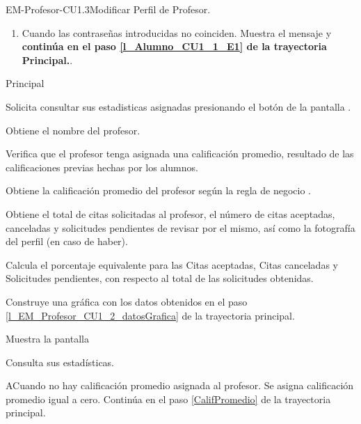 \begin{UseCase}{EM-Profesor-CU1.3}{Modificar Perfil de Profesor.}
{\begin{enumerate}
			\item \label{EM-Profesor-CU1-3-E2} Cuando las contraseñas introducidas no coinciden. Muestra el mensaje  y \textbf{continúa en el paso \ref{l_Alumno_CU1_1_E1} de la trayectoria Principal.}.
		\end{enumerate}
	}
\end{UseCase}

\begin{UCtrayectoria}{Principal}

	\UCpaso [\UCactor] Solicita consultar sus estadisticas asignadas presionando el botón  de la pantalla .

	\UCpaso Obtiene el nombre del profesor. 

	\UCpaso Verifica que el profesor tenga asignada una calificación promedio, resultado de las calificaciones previas hechas por los alumnos. 

	\UCpaso Obtiene la calificación promedio del profesor según la regla de negocio . \label{CalifPromedio}  

	\UCpaso Obtiene el total de citas solicitadas al profesor, el número de citas aceptadas, canceladas y solicitudes pendientes de revisar por el mismo, así como la fotografía del perfil (en caso de haber). 

	\UCpaso Calcula el porcentaje equivalente para las Citas aceptadas, Citas canceladas y Solicitudes pendientes, con respecto al total de las solicitudes obtenidas. \label{l_EM_Profesor_CU1_2_datosGrafica}

	\UCpaso Construye una gráfica con los datos obtenidos en el paso \ref{l_EM_Profesor_CU1_2_datosGrafica} de la trayectoria principal.

	\UCpaso Muestra la pantalla 

	\UCpaso [\UCactor] Consulta sus estadísticas.

\end{UCtrayectoria}

\begin{UCtrayectoriaA}{A}{Cuando no hay calificación promedio asignada al profesor.}
	\UCpaso	Se asigna calificación promedio igual a cero.
	\UCpaso Continúa en el paso \ref{CalifPromedio} de la trayectoria principal.
\end{UCtrayectoriaA}
